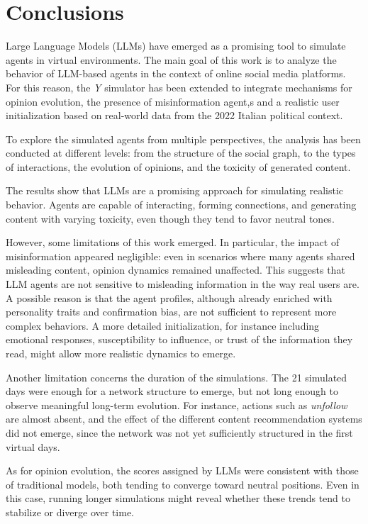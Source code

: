 \section{Conclusions}
\label{sec:conclusions}

Large Language Models (LLMs) have emerged as a promising tool to simulate agents in virtual environments. 
The main goal of this work is to analyze the behavior of LLM-based agents in the context of online social media platforms.
For this reason, the \textit{Y} simulator has been extended to integrate mechanisms for opinion evolution, the presence of misinformation agent,s and a realistic user initialization based on real-world data from the 2022 Italian political context.

\medskip
To explore the simulated agents from multiple perspectives, the analysis has been conducted at different levels: from the structure of the social graph, to the types of interactions, the evolution of opinions, and the toxicity of generated content.

The results show that LLMs are a promising approach for simulating realistic behavior. Agents are capable of interacting, forming connections, and generating content with varying toxicity, even though they tend to favor neutral tones.

\medskip
However, some limitations of this work emerged.
In particular, the impact of misinformation appeared negligible: even in scenarios where many agents shared misleading content, opinion dynamics remained unaffected.
This suggests that LLM agents are not sensitive to misleading information in the way real users are.
A possible reason is that the agent profiles, although already enriched with personality traits and confirmation bias, are not sufficient to represent more complex behaviors.
A more detailed initialization, for instance including emotional responses, susceptibility to influence, or trust of the information they read, might allow more realistic dynamics to emerge.

\medskip
Another limitation concerns the duration of the simulations. 
The 21 simulated days were enough for a network structure to emerge, but not long enough to observe meaningful long-term evolution.
For instance, actions such as \textit{unfollow} are almost absent, and the effect of the different content recommendation systems did not emerge, since the network was not yet sufficiently structured in the first virtual days.

As for opinion evolution, the scores assigned by LLMs were consistent with those of traditional models, both tending to converge toward neutral positions. 
Even in this case, running longer simulations might reveal whether these trends tend to stabilize or diverge over time.

